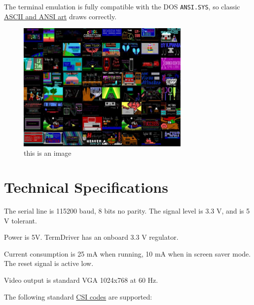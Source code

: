 \documentclass{article}
\begin{document}
The terminal emulation is fully compatible with the DOS
\texttt{ANSI.SYS}, so classic
\href{http://artscene.textfiles.com/ansi/}{ASCII and ANSI art} draws
correctly.

\begin{figure}[H]
  \centering
  \caption{this is an image}
  \includegraphics[width=0.75\textwidth]{img/img5}
\end{figure}

\hypertarget{technical-specifications}{}
\hypertarget{technical-specifications}{%
\section{Technical Specifications}\label{technical-specifications}}

The serial line is 115200 baud, 8 bits no parity. The signal level is
3.3 V, and is 5 V tolerant.

Power is 5V. TermDriver has an onboard 3.3 V regulator.

Current consumption is 25 mA when running, 10 mA when in screen saver
mode. The reset signal is active low.

Video output is standard VGA 1024x768 at 60 Hz.

The following standard
\href{https://en.wikipedia.org/wiki/ANSI_escape_code\#CSI_sequences}{CSI
codes} are supported:
\end{document}
